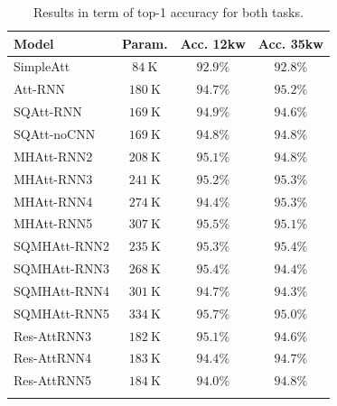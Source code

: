 \begin{table}

	\caption{Results in term of top-1 accuracy for both tasks.}

\begin{tabular}{lccc}	
	\hline 
	Model & Param. & Acc. 12kw & Acc. 35kw \\
	\hline \hline
	
	\rule{0pt}{3ex}SimpleAtt & $84 \mathrm{~K}$ & $92.9 \%$ & $92.8 \%$ \\
	Att-RNN & $180 \mathrm{~K}$& $94.7 \%$& $95.2 \%$ \\
	\hline 
	\rule{0pt}{3ex}SQAtt-RNN & $169 \mathrm{~K}$  & $94.9 \%$& $94.6 \%$ \\
	SQAtt-noCNN & $169 \mathrm{~K}$ & $94.8 \%$& $94.8 \%$ \\
	\hline \rule{0pt}{3ex}MHAtt-RNN2 & $208 \mathrm{~K}$ & $95.1 \%$& $94.8 \%$ \\
	MHAtt-RNN3 & $241 \mathrm{~K}$ & $95.2 \%$ & $95.3 \%$\\
	MHAtt-RNN4 & $274 \mathrm{~K}$ & $ 94.4\%$& $95.3 \%$ \\
	MHAtt-RNN5 & $307 \mathrm{~K}$ & $ 95.5\%$& $95.1 \%$ \\
	\hline \rule{0pt}{3ex}SQMHAtt-RNN2 &$235 \mathrm{~K}$ & $95.3 \%$& $\mathbf{95.4} \%$ \\
	SQMHAtt-RNN3 &$268 \mathrm{~K}$ & $95.4 \%$& $94.4 \%$ \\
	SQMHAtt-RNN4& $301 \mathrm{~K}$ & $94.7 \%$& $94.3 \%$ \\
	SQMHAtt-RNN5& $334 \mathrm{~K}$ & $\mathbf{95.7 \%}$& $95.0 \%$ \\
	\hline \rule{0pt}{3ex}Res-AttRNN3 &$182 \mathrm{~K}$ & $95.1\%$& $94.6 \%$ \\
	Res-AttRNN4& $183 \mathrm{~K}$ & $94.4 \%$& $94.7 \%$ \\
	Res-AttRNN5& $184 \mathrm{~K}$ & $94.0\%$& $94.8 \%$ \\
	\hline
	
	\label{table:results}
\end{tabular}
\end{table}
